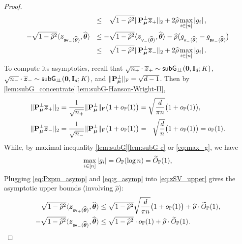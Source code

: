 \begin{proof}
\begin{equation}
\begin{aligned}
        & \le  \phantom{-} \sqrt{1 - \hat\rho^2} \| \bP_{\vmu}^\perp \bar\zz_+ \|_2 + 
        2 \hat\rho \max_{i \in [n]} \abs{g_i} , \\
        - \sqrt{1 - \hat\rho^2} \< \zz_{\mathsf{sv}_-(\hat\vtheta)}, \hat\vtheta \> \ \ 
        & \le  - \sqrt{1 - \hat\rho^2} \< \zz_{\mathsf{v}_-(\hat\vtheta)}, \hat\vtheta \> - \hat\rho \bigl(g_{\mathsf{v}_-(\hat\vtheta)} - g_{\mathsf{sv}_-(\hat\vtheta)} \bigr) \\
        & \le  \phantom{-} \sqrt{1 - \hat\rho^2} \| \bP_{\vmu}^\perp \bar\zz_- \|_2 + 
        2 \hat\rho \max_{i \in [n]} \abs{g_i} .
    \end{aligned}
\end{equation}
To compute its asymptotics, recall that $\sqrt{n_+} \cdot \overline{\text{\boldmath $z$}}_+ \sim {\sf{subG}_{\perp\!\!\!\perp}}(\mathrm{\bf 0}, \mathrm{\bf I}_d; K)$, $\sqrt{n_-} \cdot \overline{\text{\boldmath $z$}}_- \sim {\sf{subG}_{\perp\!\!\!\perp}}(\mathrm{\bf 0}, \mathrm{\bf I}_d; K)$, and $\| \mathrm{\bf P}_{{\boldsymbol{\mu}}}^\perp \|_\mathrm{F} = \sqrt{d - 1}$. Then by \cref{lem:subG_concentrate}\ref{lem:subG-Hanson-Wright-II},
\begin{align}
        \| \bP_{\vmu}^\perp \bar\zz_+ \|_2 & = \frac{1}{\sqrt{n_+}} \| \bP_{\vmu}^\perp \|_\mathrm{F} \bigl(1 + o_\P(1)\bigr)
    = \sqrt{\frac{d}{\pi n}}\big(1 + o_\P(1) \big), \notag \\
        \| \bP_{\vmu}^\perp \bar\zz_- \|_2 & = \frac{1}{\sqrt{n_-}} \| \bP_{\vmu}^\perp \|_\mathrm{F} \bigl(1 + o_\P(1)\bigr)
    = \mathmakebox[\widthof{$\displaystyle \sqrt{\frac{d}{\pi n}}\big(1 + o_\P(1) \big)$}][r]{\sqrt{\frac{d}{n}}\big(1 + o_\P(1) \big)} = o_\P(1).
    \label{eq:Pzpm_asymp}
\end{align}
While, by maximal inequality \cref{lem:subG}\ref{lem:subG-c} or \cref{eq:max_g}, we have
\begin{equation}
    \label{eq:g_asymp}
    \max_{i \in [n]} \left|{g_i}\right| = O_{\mathbb{P}}(\log n) = \widetilde O_{\mathbb{P}}(1),
\end{equation}
Plugging \cref{eq:Pzpm_asymp} and \eqref{eq:g_asymp} into \cref{eq:zSV_upper} gives the asymptotic upper bounds (involving $\hat\rho$):
\begin{equation}
    \label{eq:zSV_upper_asymp}
    \begin{aligned}
        \phantom{-} \sqrt{1 - \widehat\rho^2} \langle \text{\boldmath $z$}_{\mathsf{sv}_+(\widehat{{\boldsymbol{\theta}}})}, \widehat{{\boldsymbol{\theta}}} \rangle  
        & \le  \sqrt{1 - \widehat\rho^2} \sqrt{\frac{d}{\pi n}}\big(1 + o_{\mathbb{P}}(1) \big) + 
        \widehat\rho \cdot \widetilde O_{\mathbb{P}}(1) , \\
        - \sqrt{1 - \widehat\rho^2} \langle \text{\boldmath $z$}_{\mathsf{sv}_-(\widehat{{\boldsymbol{\theta}}})}, \widehat{{\boldsymbol{\theta}}} \rangle 
        & \le  \sqrt{1 - \widehat\rho^2} \cdot o_{\mathbb{P}}(1) + 
        \widehat\rho \cdot \widetilde O_{\mathbb{P}}(1) .
    \end{aligned}
\end{equation}


\end{proof}
